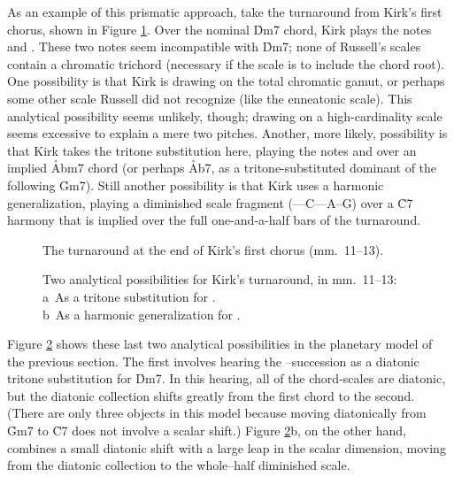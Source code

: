 As an example of this prismatic approach, take the turnaround from Kirk's
first chorus, shown in Figure \ref{csa:first-chorus-turnaround}. Over the
nominal \h{Dm7} chord, Kirk plays the notes \Eflat and \Dflat. These two notes
seem incompatible with \h{Dm7}; none of Russell's scales contain a chromatic
trichord (necessary if the scale is to include the chord root). One
possibility is that Kirk is drawing on the total chromatic gamut, or perhaps
some other scale Russell did not recognize (like the enneatonic scale). This
analytical possibility seems unlikely, though; drawing on a high-cardinality
scale seems excessive to explain a mere two pitches. Another, more likely,
possibility is that Kirk takes the tritone substitution here, playing the
notes \Eflat and \Dflat over an implied \h{Abm7} chord (or perhaps \h{Ab7}, as a
tritone-substituted dominant of the following \h{Gm7}). Still another
possibility is that Kirk uses a harmonic generalization, playing a diminished
scale fragment (\Eflat--\Dflat--C--\Bflat--A--G) over a \h{C7} harmony that is
implied over the full one-and-a-half bars of the turnaround.

\begin{figure}[tbp]
  \caption{The turnaround at the end of Kirk's first chorus (mm.~11--13).}
  \label{csa:first-chorus-turnaround}
\end{figure}

\begin{figure}[tbp]
  \captionsetup{format=hang}
  \caption[Two analytical possibilities for Kirk's turnaround.]{%
    Two analytical possibilities for Kirk's turnaround, in mm.~11--13: \\
    a\rightparen\ As a tritone substitution for . \\
    b\rightparen\ As a harmonic generalization for .}
  \label{csa:turnaround-transformations}
\end{figure}

Figure \ref{csa:turnaround-transformations} shows these last two analytical
possibilities in the planetary model of the previous section. The first
involves hearing the \Eflat--\Dflat succession as a diatonic tritone
substitution for \h{Dm7}. In this hearing, all of the chord-scales
are diatonic, but the diatonic collection shifts greatly from the first chord
to the second. (There are only three objects in this model because moving
diatonically from \h{Gm7} to \h{C7} does not involve a scalar shift.) Figure
\ref{csa:turnaround-transformations}b, on the other hand, combines a small
diatonic shift with a large leap in the scalar dimension, moving from the
diatonic collection to the whole--half diminished scale.

